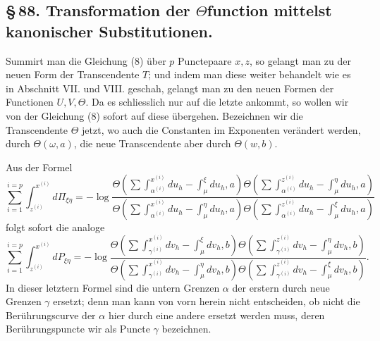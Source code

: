 \documentclass[10pt]{article}
\begin{document}
\subsection*{\S\,88. Transformation der \(\Theta\)function mittelst kanonischer Substitutionen.}

Summirt man die Gleichung (8) über \(p\) Punctepaare \(x,z\), so gelangt man zu der neuen Form der Transcendente \(T\); und indem man diese weiter behandelt wie es in Abschnitt VII. und VIII. geschah, gelangt man zu den neuen Formen der Functionen \(U,V,\Theta\). Da es schliesslich nur auf die letzte ankommt, so wollen wir von der Gleichung (8) sofort auf diese übergehen. Bezeichnen wir die Transcendente \(\Theta\) jetzt, wo auch die Constanten im Exponenten verändert werden, durch \(\Theta(\omega,a)\), die neue Transcendente aber durch \(\Theta(w,b)\).

Aus der Formel
\[
\sum_{i=1}^{i=p}\int_{z^{(i)}}^{x^{(i)}}d\Pi_{\xi\eta}
=
-\log
\frac{
\Theta\!\left(\sum\int_{\alpha^{(i)}}^{x^{(i)}}du_h-\int_{\mu}^{\xi}du_h,a\right)
\Theta\!\left(\sum\int_{\alpha^{(i)}}^{z^{(i)}}du_h-\int_{\mu}^{\eta}du_h,a\right)
}{
\Theta\!\left(\sum\int_{\alpha^{(i)}}^{x^{(i)}}du_h-\int_{\mu}^{\eta}du_h,a\right)
\Theta\!\left(\sum\int_{\alpha^{(i)}}^{z^{(i)}}du_h-\int_{\mu}^{\xi}du_h,a\right)
}
\]
folgt sofort die analoge
\[
\sum_{i=1}^{i=p}\int_{z^{(i)}}^{x^{(i)}}dP_{\xi\eta}
=
-\log
\frac{
\Theta\!\left(\sum\int_{\gamma^{(i)}}^{x^{(i)}}dv_h-\int_{\mu}^{\xi}dv_h,b\right)
\Theta\!\left(\sum\int_{\gamma^{(i)}}^{z^{(i)}}dv_h-\int_{\mu}^{\eta}dv_h,b\right)
}{
\Theta\!\left(\sum\int_{\gamma^{(i)}}^{x^{(i)}}dv_h-\int_{\mu}^{\eta}dv_h,b\right)
\Theta\!\left(\sum\int_{\gamma^{(i)}}^{z^{(i)}}dv_h-\int_{\mu}^{\xi}dv_h,b\right)
}.
\]
In dieser letztern Formel sind die untern Grenzen \(\alpha\) der erstern durch neue Grenzen \(\gamma\) ersetzt; denn man kann von vorn herein nicht entscheiden, ob nicht die Berührungscurve der \(\alpha\) hier durch eine andere ersetzt werden muss, deren Berührungspuncte wir als Puncte \(\gamma\) bezeichnen.
\end{document}
